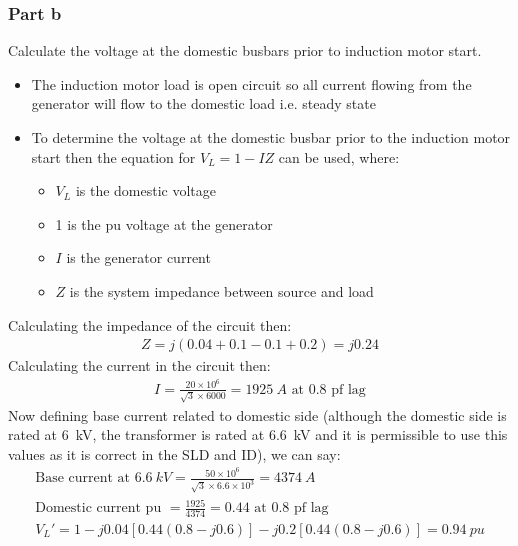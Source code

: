 \documentclass[class=report, crop=false, 12pt,a4paper]{standalone}
\begin{document}
\subsubsection{Part b}
Calculate the voltage at the domestic busbars prior to induction motor start. 
\begin{itemize}
	\item The induction motor load is open circuit so all current flowing from the generator will flow to the domestic load i.e. steady state
	\item To determine the voltage at the domestic busbar prior to the induction motor start then the equation for $V_L = 1 - IZ$ can be used, where:
	\begin{itemize}
		\item $V_L$ is the domestic voltage
		\item 1 is the pu voltage at the generator
		\item $I$ is the generator current
		\item $Z$ is the system impedance between source and load
	\end{itemize}
\end{itemize}
Calculating the impedance of the circuit then:
\begin{gather}
	Z = j\left(0.04 + 0.1 - 0.1 + 0.2\right) = j0.24
\end{gather}
Calculating the current in the circuit then:
\begin{gather}
	I = \frac{20 \times 10^6}{\sqrt{3}\times 6000} = \SI{1925}{A}\textrm{ at 0.8 pf lag}
\end{gather}
Now defining base current related to domestic side (although the domestic side is rated at \SI{6}{kV}, the transformer is rated at \SI{6.6}{kV} and it is permissible to use this values as it is correct in the SLD and ID), we can say:
\begin{gather}
	\textrm{Base current at }\SI{6.6}{kV} = \frac{50\times 10^6}{\sqrt{3}\times 6.6\times 10^3} = \SI{4374}{A}\\
	\textrm{Domestic current pu } = \frac{1925}{4374} = 0.44 \textrm{ at 0.8 pf lag}\\
	V_L' = 1 - j0.04\left[0.44\left(0.8-j0.6\right)\right] - j0.2\left[0.44\left(0.8-j0.6\right)\right] = \SI{0.94}{pu}
\end{gather}
\end{document}
